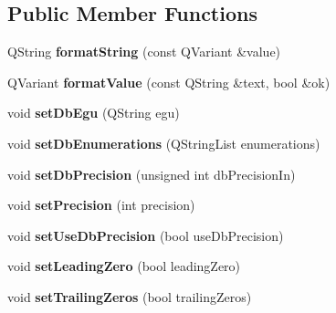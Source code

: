 \subsection*{Public Member Functions}
\begin{DoxyCompactItemize}
\item 
\hypertarget{classQEStringFormatting_a7dcd4f51dd9581cb1ede68697bb7faae}{
QString {\bfseries formatString} (const QVariant \&value)}
\label{classQEStringFormatting_a7dcd4f51dd9581cb1ede68697bb7faae}

\item 
\hypertarget{classQEStringFormatting_ad691dfad14b08cb8da30a536a4c271c9}{
QVariant {\bfseries formatValue} (const QString \&text, bool \&ok)}
\label{classQEStringFormatting_ad691dfad14b08cb8da30a536a4c271c9}

\item 
\hypertarget{classQEStringFormatting_a0b42ff70e1c401971318a2274b73db57}{
void {\bfseries setDbEgu} (QString egu)}
\label{classQEStringFormatting_a0b42ff70e1c401971318a2274b73db57}

\item 
\hypertarget{classQEStringFormatting_ae6384881d9b6b2149677088221610642}{
void {\bfseries setDbEnumerations} (QStringList enumerations)}
\label{classQEStringFormatting_ae6384881d9b6b2149677088221610642}

\item 
\hypertarget{classQEStringFormatting_adb6417582982e859366931cc6a95a2db}{
void {\bfseries setDbPrecision} (unsigned int dbPrecisionIn)}
\label{classQEStringFormatting_adb6417582982e859366931cc6a95a2db}

\item 
\hypertarget{classQEStringFormatting_ae8ec59de085a51d326c06b5232c13cd3}{
void {\bfseries setPrecision} (int precision)}
\label{classQEStringFormatting_ae8ec59de085a51d326c06b5232c13cd3}

\item 
\hypertarget{classQEStringFormatting_a8301e3fb5cc4251bf54e92eeb493c14a}{
void {\bfseries setUseDbPrecision} (bool useDbPrecision)}
\label{classQEStringFormatting_a8301e3fb5cc4251bf54e92eeb493c14a}

\item 
\hypertarget{classQEStringFormatting_a7c56a0d189e63d42f3b845351df8ca62}{
void {\bfseries setLeadingZero} (bool leadingZero)}
\label{classQEStringFormatting_a7c56a0d189e63d42f3b845351df8ca62}

\item 
\hypertarget{classQEStringFormatting_a36d0be51ecd1c086eff2fa45f630cd82}{
void {\bfseries setTrailingZeros} (bool trailingZeros)}
\label{classQEStringFormatting_a36d0be51ecd1c086eff2fa45f630cd82}


\end{DoxyCompactItemize}

